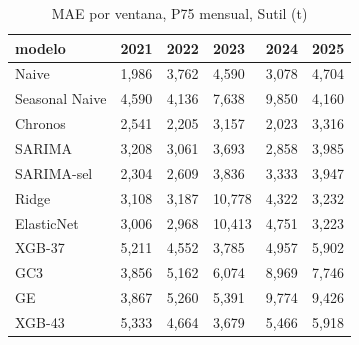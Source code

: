 \begin{table}[H]
\centering
\small
\caption{MAE por ventana, P75 mensual, Sutil (t)}
\label{tab:T05_MAE_P75_por_ventana_sutil}
\begin{tabular}{llllll}
\toprule
modelo & 2021 & 2022 & 2023 & 2024 & 2025 \\
\midrule
Naive & 1,986 & 3,762 & 4,590 & 3,078 & 4,704 \\
Seasonal Naive & 4,590 & 4,136 & 7,638 & 9,850 & 4,160 \\
Chronos & 2,541 & 2,205 & 3,157 & 2,023 & 3,316 \\
SARIMA & 3,208 & 3,061 & 3,693 & 2,858 & 3,985 \\
SARIMA-sel & 2,304 & 2,609 & 3,836 & 3,333 & 3,947 \\
Ridge & 3,108 & 3,187 & 10,778 & 4,322 & 3,232 \\
ElasticNet & 3,006 & 2,968 & 10,413 & 4,751 & 3,223 \\
XGB-37 & 5,211 & 4,552 & 3,785 & 4,957 & 5,902 \\
GC3 & 3,856 & 5,162 & 6,074 & 8,969 & 7,746 \\
GE & 3,867 & 5,260 & 5,391 & 9,774 & 9,426 \\
XGB-43 & 5,333 & 4,664 & 3,679 & 5,466 & 5,918 \\
\bottomrule
\end{tabular}
\end{table}